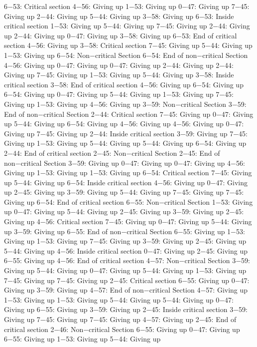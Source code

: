 6−53: Critical section
4−56: Giving up
1−53: Giving up
0−47: Giving up
7−45: Giving up
2−44: Giving up
5−44: Giving up
3−58: Giving up
6−53: Inside critical section
1−53: Giving up
5−44: Giving up
7−45: Giving up
2−44: Giving up
2−44: Giving up
0−47: Giving up
3−58: Giving up
6−53: End of critical section
4−56: Giving up
3−58: Critical section
7−45: Giving up
5−44: Giving up
1−53: Giving up
6−54: Non−critical Section
6−54: End of non−critical Section
4−56: Giving up
0−47: Giving up
0−47: Giving up
2−44: Giving up
2−44: Giving up
7−45: Giving up
1−53: Giving up
5−44: Giving up
3−58: Inside critical section
3−58: End of critical section
4−56: Giving up
6−54: Giving up
6−54: Giving up
0−47: Giving up
5−44: Giving up
1−53: Giving up
7−45: Giving up
1−53: Giving up
4−56: Giving up
3−59: Non−critical Section
3−59: End of non−critical Section
2−44: Critical section
7−45: Giving up
0−47: Giving up
5−44: Giving up
6−54: Giving up
4−56: Giving up
4−56: Giving up
0−47: Giving up
7−45: Giving up
2−44: Inside critical section
3−59: Giving up
7−45: Giving up
1−53: Giving up
5−44: Giving up
5−44: Giving up
6−54: Giving up
2−44: End of critical section
2−45: Non−critical Section
2−45: End of non−critical Section
3−59: Giving up
0−47: Giving up
0−47: Giving up
4−56: Giving up
1−53: Giving up
1−53: Giving up
6−54: Critical section
7−45: Giving up
5−44: Giving up
6−54: Inside critical section
4−56: Giving up
0−47: Giving up
2−45: Giving up
3−59: Giving up
5−44: Giving up
7−45: Giving up
7−45: Giving up
6−54: End of critical section
6−55: Non−critical Section
1−53: Giving up
0−47: Giving up
5−44: Giving up
2−45: Giving up
3−59: Giving up
2−45: Giving up
4−56: Critical section
7−45: Giving up
0−47: Giving up
5−44: Giving up
3−59: Giving up
6−55: End of non−critical Section
6−55: Giving up
1−53: Giving up
1−53: Giving up
7−45: Giving up
3−59: Giving up
2−45: Giving up
5−44: Giving up
4−56: Inside critical section
0−47: Giving up
2−45: Giving up
6−55: Giving up
4−56: End of critical section
4−57: Non−critical Section
3−59: Giving up
5−44: Giving up
0−47: Giving up
5−44: Giving up
1−53: Giving up
7−45: Giving up
7−45: Giving up
2−45: Critical section
6−55: Giving up
0−47: Giving up
3−59: Giving up
4−57: End of non−critical Section
4−57: Giving up
1−53: Giving up
1−53: Giving up
5−44: Giving up
5−44: Giving up
0−47: Giving up
6−55: Giving up
3−59: Giving up
2−45: Inside critical section
3−59: Giving up
7−45: Giving up
7−45: Giving up
4−57: Giving up
2−45: End of critical section
2−46: Non−critical Section
6−55: Giving up
0−47: Giving up
6−55: Giving up
1−53: Giving up
5−44: Giving up
